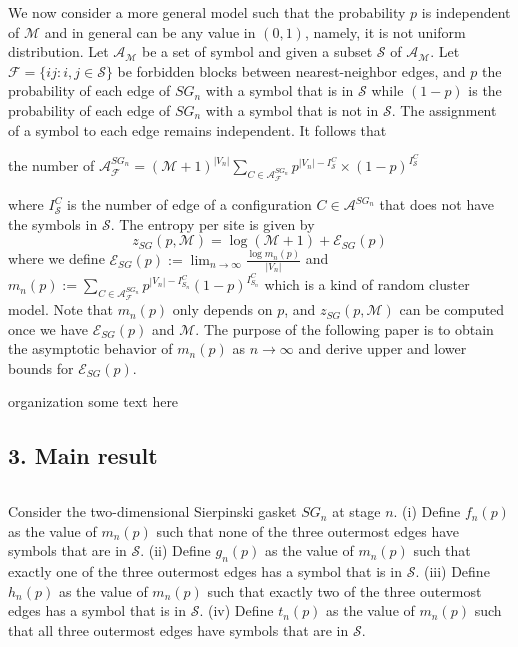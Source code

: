 We now consider a more general model such that the probability $p$ is independent of $\mathscr{M}$ and in general can be any value in $(0,1)$, namely, it is not uniform distribution. Let $\mathscr{A}_{\mathscr{M}}$ be a set of symbol and given a subset $\mathscr{S}$ of $\mathscr{A}_{\mathscr{M}}$. Let $\mathscr{F} = \{ij:i,j \in \mathscr{S}\}$ be forbidden blocks between nearest-neighbor edges, and $p$ the probability of each edge of $SG_n$ with a symbol that is in $\mathscr{S}$ while $(1-p)$ is the probability of each edge of $SG_n$ with a symbol that is not in $\mathscr{S}$. The assignment of a symbol to each edge remains independent. It follows that
\begin{center}
the number of $\mathscr{A}^{SG_n}_{\mathscr{F}} = (\mathscr{M} + 1)^{|V_n|}\sum\limits_{C \in \mathscr{A}^{SG_n}_{\mathscr{F}}}p^{|V_n| - I^C_{\mathscr{S}}}\times (1-p)^{I^C_{\mathscr{S}}}$
\end{center}
where $I^C_{\mathscr{S}}$ is the number of edge of a configuration $C \in \mathscr{A}^{SG_n}$ that does not have the symbols in $\mathscr{S}$. The entropy per site is given by
$$z_{SG}(p,\mathscr{M})=\log (\mathscr{M} + 1) + \mathscr{E}_{SG}(p)$$
where we define $\mathscr{E}_{SG}(p):=\lim_{n\rightarrow \infty}\frac{\log m_n(p)}{|V_n|}$ and $m_n(p):=\sum_{C \in \mathscr{A}^{SG_n}_{\mathscr{F}}}p^{|V_n|-I^C_{S_n}}(1-p)^{I^C_{S_n}}$ which is a kind of random cluster model. Note that $m_n(p)$ only depends on $p$, and $z_{SG}(p,\mathscr{M})$ can be computed once we have $\mathscr{E}_{SG}(p)$ and $\mathscr{M}$. The purpose of the following paper is to obtain the asymptotic behavior of $m_n(p)$ as $n \rightarrow \infty$ and derive upper and lower bounds for $\mathscr{E}_{SG}(p)$.

organization some text here



\subsection*{3. Main result}$ $%


\begin{define}\label{def:aa}
Consider the two-dimensional Sierpinski gasket $SG_n$ at stage $n$. (i) Define $f_n(p)$ as the value of $m_n(p)$ such that none of the three outermost edges have symbols that are in $\mathscr{S}$. (ii) Define $g_n(p)$ as the value of $m_n(p)$ such that exactly one of the three outermost edges has a symbol that is in $\mathscr{S}$. (iii) Define $h_n(p)$ as the value of $m_n(p)$ such that exactly two of the three outermost edges has a symbol that is in $\mathscr{S}$. (iv) Define $t_n(p)$ as the value of $m_n(p)$ such that all three outermost edges have symbols that are in $\mathscr{S}$.
\end{define}

